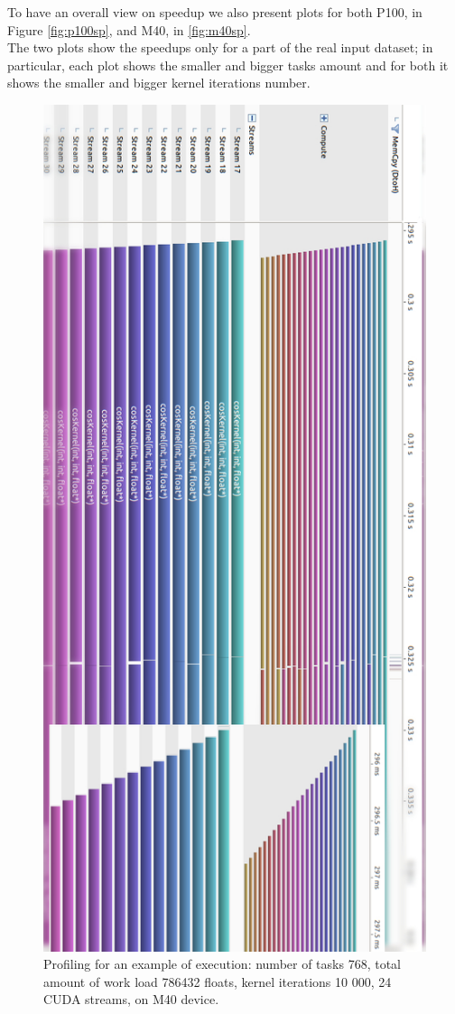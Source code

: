 	To have an overall view on speedup we also present plots for both P100, in Figure \ref{fig:p100sp}, and M40, in \ref{fig:m40sp}.\\
	The two plots show the speedups only for a part of the real input dataset; in particular, each plot shows the smaller and bigger tasks amount and for both it shows the smaller and bigger kernel iterations number.

	\begin{figure}
		\vspace{-2cm}
		\centering

		\includegraphics[scale=0.5]{plots/cos_profile.jpg}
		\caption{Profiling for an example of execution: number of tasks 768, total amount of work load 786432 floats, kernel iterations 10 000, 24 CUDA streams, on M40 device.}
		\label{fig:cosprofiling}
	
	\end{figure}

